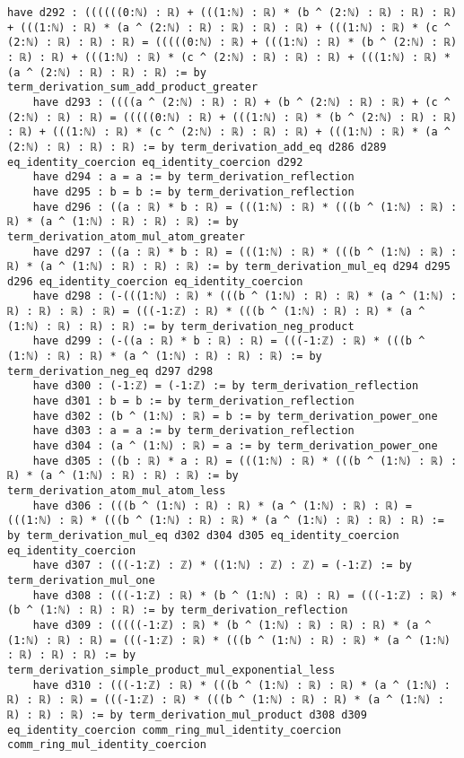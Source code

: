\documentclass{article}
\begin{document}
\begin{tcolorbox}[colback=white!10, width=\linewidth]
\begin{lstlisting}[language=Lean4]
    have d292 : ((((((0:ℕ) : ℝ) + (((1:ℕ) : ℝ) * (b ^ (2:ℕ) : ℝ) : ℝ) : ℝ) + (((1:ℕ) : ℝ) * (a ^ (2:ℕ) : ℝ) : ℝ) : ℝ) : ℝ) + (((1:ℕ) : ℝ) * (c ^ (2:ℕ) : ℝ) : ℝ) : ℝ) = (((((0:ℕ) : ℝ) + (((1:ℕ) : ℝ) * (b ^ (2:ℕ) : ℝ) : ℝ) : ℝ) + (((1:ℕ) : ℝ) * (c ^ (2:ℕ) : ℝ) : ℝ) : ℝ) + (((1:ℕ) : ℝ) * (a ^ (2:ℕ) : ℝ) : ℝ) : ℝ) := by term_derivation_sum_add_product_greater
    have d293 : ((((a ^ (2:ℕ) : ℝ) : ℝ) + (b ^ (2:ℕ) : ℝ) : ℝ) + (c ^ (2:ℕ) : ℝ) : ℝ) = (((((0:ℕ) : ℝ) + (((1:ℕ) : ℝ) * (b ^ (2:ℕ) : ℝ) : ℝ) : ℝ) + (((1:ℕ) : ℝ) * (c ^ (2:ℕ) : ℝ) : ℝ) : ℝ) + (((1:ℕ) : ℝ) * (a ^ (2:ℕ) : ℝ) : ℝ) : ℝ) := by term_derivation_add_eq d286 d289 eq_identity_coercion eq_identity_coercion d292
    have d294 : a = a := by term_derivation_reflection
    have d295 : b = b := by term_derivation_reflection
    have d296 : ((a : ℝ) * b : ℝ) = (((1:ℕ) : ℝ) * (((b ^ (1:ℕ) : ℝ) : ℝ) * (a ^ (1:ℕ) : ℝ) : ℝ) : ℝ) := by term_derivation_atom_mul_atom_greater
    have d297 : ((a : ℝ) * b : ℝ) = (((1:ℕ) : ℝ) * (((b ^ (1:ℕ) : ℝ) : ℝ) * (a ^ (1:ℕ) : ℝ) : ℝ) : ℝ) := by term_derivation_mul_eq d294 d295 d296 eq_identity_coercion eq_identity_coercion
    have d298 : (-(((1:ℕ) : ℝ) * (((b ^ (1:ℕ) : ℝ) : ℝ) * (a ^ (1:ℕ) : ℝ) : ℝ) : ℝ) : ℝ) = (((-1:ℤ) : ℝ) * (((b ^ (1:ℕ) : ℝ) : ℝ) * (a ^ (1:ℕ) : ℝ) : ℝ) : ℝ) := by term_derivation_neg_product
    have d299 : (-((a : ℝ) * b : ℝ) : ℝ) = (((-1:ℤ) : ℝ) * (((b ^ (1:ℕ) : ℝ) : ℝ) * (a ^ (1:ℕ) : ℝ) : ℝ) : ℝ) := by term_derivation_neg_eq d297 d298
    have d300 : (-1:ℤ) = (-1:ℤ) := by term_derivation_reflection
    have d301 : b = b := by term_derivation_reflection
    have d302 : (b ^ (1:ℕ) : ℝ) = b := by term_derivation_power_one
    have d303 : a = a := by term_derivation_reflection
    have d304 : (a ^ (1:ℕ) : ℝ) = a := by term_derivation_power_one
    have d305 : ((b : ℝ) * a : ℝ) = (((1:ℕ) : ℝ) * (((b ^ (1:ℕ) : ℝ) : ℝ) * (a ^ (1:ℕ) : ℝ) : ℝ) : ℝ) := by term_derivation_atom_mul_atom_less
    have d306 : (((b ^ (1:ℕ) : ℝ) : ℝ) * (a ^ (1:ℕ) : ℝ) : ℝ) = (((1:ℕ) : ℝ) * (((b ^ (1:ℕ) : ℝ) : ℝ) * (a ^ (1:ℕ) : ℝ) : ℝ) : ℝ) := by term_derivation_mul_eq d302 d304 d305 eq_identity_coercion eq_identity_coercion
    have d307 : (((-1:ℤ) : ℤ) * ((1:ℕ) : ℤ) : ℤ) = (-1:ℤ) := by term_derivation_mul_one
    have d308 : (((-1:ℤ) : ℝ) * (b ^ (1:ℕ) : ℝ) : ℝ) = (((-1:ℤ) : ℝ) * (b ^ (1:ℕ) : ℝ) : ℝ) := by term_derivation_reflection
    have d309 : (((((-1:ℤ) : ℝ) * (b ^ (1:ℕ) : ℝ) : ℝ) : ℝ) * (a ^ (1:ℕ) : ℝ) : ℝ) = (((-1:ℤ) : ℝ) * (((b ^ (1:ℕ) : ℝ) : ℝ) * (a ^ (1:ℕ) : ℝ) : ℝ) : ℝ) := by term_derivation_simple_product_mul_exponential_less
    have d310 : (((-1:ℤ) : ℝ) * (((b ^ (1:ℕ) : ℝ) : ℝ) * (a ^ (1:ℕ) : ℝ) : ℝ) : ℝ) = (((-1:ℤ) : ℝ) * (((b ^ (1:ℕ) : ℝ) : ℝ) * (a ^ (1:ℕ) : ℝ) : ℝ) : ℝ) := by term_derivation_mul_product d308 d309 eq_identity_coercion comm_ring_mul_identity_coercion comm_ring_mul_identity_coercion

\end{lstlisting}
\end{tcolorbox}
\end{document}
